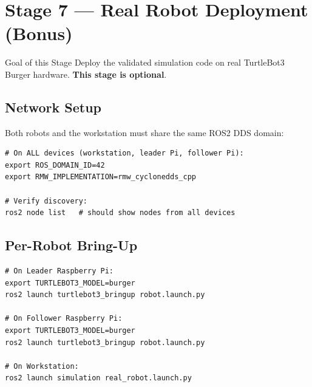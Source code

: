 \documentclass[11pt, a4paper]{article}
\begin{document}
\newpage
\section{Stage 7 — Real Robot Deployment (Bonus)}

\begin{infobox}{Goal of this Stage}
Deploy the validated simulation code on real TurtleBot3 Burger hardware.
\textbf{This stage is optional}.
\end{infobox}


\subsection{Network Setup}

Both robots and the workstation must share the same ROS2 DDS domain:

\begin{lstlisting}[style=shellcode]
# On ALL devices (workstation, leader Pi, follower Pi):
export ROS_DOMAIN_ID=42
export RMW_IMPLEMENTATION=rmw_cyclonedds_cpp

# Verify discovery:
ros2 node list   # should show nodes from all devices
\end{lstlisting}

\subsection{Per-Robot Bring-Up}

\begin{lstlisting}[style=shellcode]
# On Leader Raspberry Pi:
export TURTLEBOT3_MODEL=burger
ros2 launch turtlebot3_bringup robot.launch.py

# On Follower Raspberry Pi:
export TURTLEBOT3_MODEL=burger
ros2 launch turtlebot3_bringup robot.launch.py

# On Workstation:
ros2 launch simulation real_robot.launch.py
\end{lstlisting}
\end{document}
